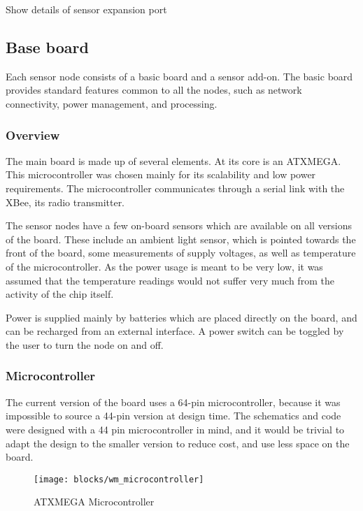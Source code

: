 Show details of sensor expansion port

\subsection{Base board}

Each sensor node consists of a basic board and a sensor add-on. The basic board
provides standard features common to all the nodes, such as network
connectivity, power management, and processing.

\subsubsection{Overview}

The main board is made up of several elements. At its core is an ATXMEGA. This
microcontroller was chosen mainly for its scalability and low power
requirements. The microcontroller communicates through a serial link with the
XBee, its radio transmitter.

The sensor nodes have a few on-board sensors which are available on all versions
of the board. These include an ambient light sensor, which is pointed towards
the front of the board, some measurements of supply voltages, as well as
temperature of the microcontroller. As the power usage is meant to be very low,
it was assumed that the temperature readings would not suffer very much from
the activity of the chip itself.

Power is supplied mainly by batteries which are placed directly on the board,
and can be recharged from an external interface. A power switch can be toggled
by the user to turn the node on and off.

\subsubsection{Microcontroller}

The current version of the board uses a 64-pin microcontroller, because it
was impossible to source a 44-pin version at design time. The schematics and
code were designed with a 44 pin microcontroller in mind, and it would be
trivial to adapt the design to the smaller version to reduce cost, and use less
space on the board.

\begin{figure}[htpb]
  \begin{center}
    \texttt{[image: blocks/wm\_microcontroller]}
  \end{center}
  \caption{ATXMEGA Microcontroller}
  \label{fig:microcontroller}
\end{figure}


